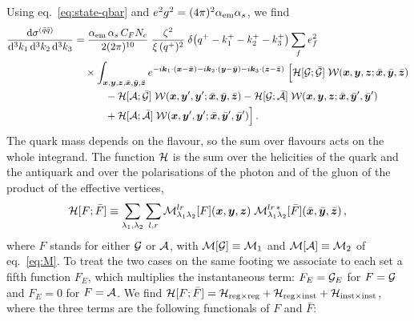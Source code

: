 Using eq.~\eqref{eq:state-qbar} and $e^2g^2=(4\pi)^2\alpha_{\rm em}\alpha_s$, we find
\begin{align}
\frac{{\rm d}\sigma^{(\bar q\bar q)}}{{\rm d}^3k_1\,{\rm d}^3k_2\,{\rm d}^3k_3}=&\;
\frac{\alpha_{\rm em}\,\alpha_s\,C_FN_c}{2(2\pi)^{10}}\;\frac{\zeta^2}{\xi\,(q^+)^2}\;
\delta\big(q^+-k_1^+-k_2^+-k_3^+\big)\sum_fe_f^2
\nonumber\\
&\times\int_{\bm{x},\bm{y},\bm{z},\bar{\bm{x}},\bar{\bm{y}},\bar{\bm{z}}}e^{-i\bm{k}_1\cdot(\bm{x}-\bar{\bm{x}})-i\bm{k}_2\cdot(\bm{y}-\bar{\bm{y}})-i\bm{k}_3\cdot(\bm{z}-\bar{\bm{z}})}\;
\Big[\mathcal{H}[\mathcal{G};\bar{\mathcal{G}}]\;\mathcal{W}(\bm{x},\bm{y},\bm{z};\bar{\bm{x}},\bar{\bm{y}},\bar{\bm{z}})
\nonumber\\
&\qquad-\mathcal{H}[\mathcal{A};\bar{\mathcal{G}}]\;\mathcal{W}(\bm{x},\bm{y}',\bm{y}';\bar{\bm{x}},\bar{\bm{y}},\bar{\bm{z}})
-\mathcal{H}[\mathcal{G};\bar{\mathcal{A}}]\;\mathcal{W}(\bm{x},\bm{y},\bm{z};\bar{\bm{x}},\bar{\bm{y}}',\bar{\bm{y}}')
\nonumber\\
&\qquad+\mathcal{H}[\mathcal{A};\bar{\mathcal{A}}]\;\mathcal{W}(\bm{x},\bm{y}',\bm{y}';\bar{\bm{x}},\bar{\bm{y}}',\bar{\bm{y}}')\Big]\,.
\label{eq:xs-qbar}
\end{align}
The quark mass depends on the flavour, so the sum over flavours acts on the whole integrand. The
function $\mathcal{H}$ is the sum over the helicities of the quark and the antiquark and over the polarisations
of the photon and of the gluon of the product of the effective vertices,
\begin{equation}
\mathcal{H}[F;\bar F]\equiv\sum_{\lambda_1,\lambda_2}\sum_{l,r}\mathcal{M}^{lr}_{\lambda_1\lambda_2}[F](\bm{x},\bm{y},\bm{z})\;
\mathcal{M}^{lr\,*}_{\lambda_1\lambda_2}[\bar F](\bar{\bm{x}},\bar{\bm{y}},\bar{\bm{z}})\,,
\label{eq:Hdef}
\end{equation}
where $F$ stands for either $\mathcal{G}$ or $\mathcal{A}$, with $\mathcal{M}[\mathcal{G}]\equiv\mathcal{M}_1$ and $\mathcal{M}[\mathcal{A}]\equiv\mathcal{M}_2$ of
eq.~\eqref{eq:M}. To treat the two cases on the same footing we associate to each set a fifth function
$F_E$, which multiplies the instantaneous term: $F_E=\mathcal{G}_E$ for $F=\mathcal{G}$ and $F_E=0$ for $F=\mathcal{A}$. We
find $\mathcal{H}[F;\bar F]=\mathcal{H}_{\rm reg\times reg}+\mathcal{H}_{\rm reg\times inst}+\mathcal{H}_{\rm inst\times inst}$, where the
three terms are the following functionals of $F$ and $\bar F$:
